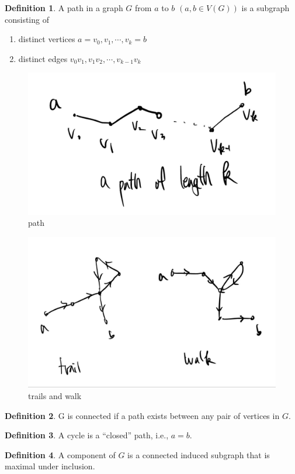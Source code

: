 \documentclass{article}
\theoremstyle{definition}
\newtheorem{defn}{Definition}[]
\begin{document}
\begin{defn}
    A path in a graph $G$ from $a$ to $b$ $(a, b \in V(G))$ is a subgraph 
    consisting of 
    \begin{enumerate}
        \item distinct vertices $a = v_0, v_1, \cdots, v_k = b$
        \item distinct edges $v_0 v_1, v_1 v_2, \cdots, v_{k-1} v_k $
    \end{enumerate}
    \begin{figure}[!h]
        \centerline{\includegraphics[width=0.5\columnwidth]{path.jpg}}
        \caption{path}
        \label{path} 
    \end{figure}
    \begin{figure}[!h]
        \centerline{\includegraphics[width=0.5\columnwidth]{trail_walk.jpg}}
        \caption{trails and walk}
        \label{tw} 
    \end{figure}
\end{defn}
\begin{defn}
    G is connected if a path exists between any pair of vertices in $G$. 
\end{defn}
\begin{defn}
    A cycle is a ``closed'' path, i.e., $a=b$.
\end{defn}
\begin{defn}
    A component of $G$ is a connected induced subgraph that is maximal 
    under inclusion.
\end{defn}
\end{document}

